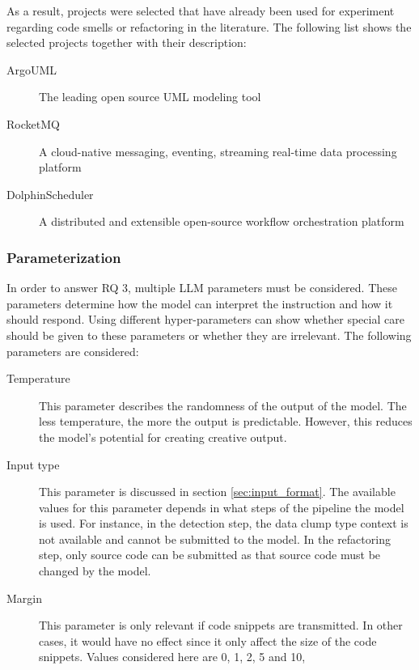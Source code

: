 As a result, projects were selected that have already been used for experiment regarding code smells or refactoring in the literature. The following list shows the selected projects together with their description:
\begin{description}
    \item[ArgoUML] The leading open source UML modeling tool
    \item[RocketMQ] A cloud-native messaging, eventing, streaming real-time data processing platform
    \item[DolphinScheduler] A distributed and extensible open-source workflow orchestration platform
\end{description}


\subsubsection{Parameterization}

In order to answer RQ 3, multiple \ac{LLM} parameters must be considered.  These parameters determine how the model can interpret the instruction and how it should respond. Using different hyper-parameters can show whether special care should be given to these parameters or whether they are irrelevant. The following parameters are considered: 

\begin{description}
	\item [Temperature] This parameter describes the randomness of the output of the model. The less temperature, the more the output is predictable. However, this reduces the model's potential for creating creative output.
	
	
	\item [Input type] This parameter is discussed in section \ref{sec:input_format}. The available values for this parameter depends in what steps of the pipeline the model is used. For instance, in the detection step, the data clump type context is not available and cannot be submitted to the model. In the refactoring step, only source code can be submitted as that source code must be changed by the model.
	
	\item [Margin] This parameter is only relevant if code snippets are transmitted. In other cases, it would have no effect since it only affect the size of the code snippets. Values considered here are 0, 1, 2, 5 and 10, 
	
	
\end{description}


